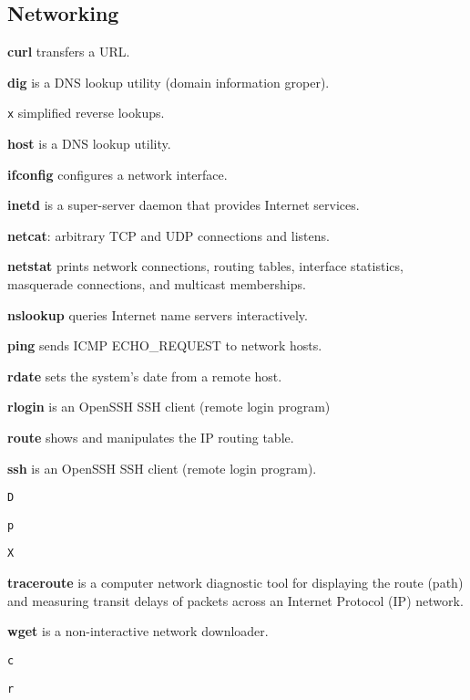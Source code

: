 \subsection{Networking}
\textbf{curl} transfers a URL.

\textbf{dig} is a DNS lookup utility (domain information groper).
\begin{enumx}
	\item [\texttt{x}] simplified reverse lookups.
\end{enumx}

\textbf{host} is a DNS lookup utility.

\textbf{ifconfig} configures a network interface.

\textbf{inetd} is a super-server daemon that provides Internet services.

\textbf{netcat}: arbitrary TCP and UDP connections and listens.

\textbf{netstat} prints network connections, routing tables, 
interface statistics, masquerade connections, and multicast memberships.

\textbf{nslookup} queries Internet name servers interactively.

\textbf{ping} sends ICMP ECHO\_REQUEST to network hosts.

\textbf{rdate} sets the system's date from a remote host.

\textbf{rlogin} is an OpenSSH SSH client (remote login program)

\textbf{route} shows and manipulates the IP routing table.

\textbf{ssh} is an OpenSSH SSH client (remote login program).
\begin{enumx}
	\item [\texttt{D}]
	\item [\texttt{p}]
	\item [\texttt{X}]
\end{enumx}

\textbf{traceroute} is a computer network diagnostic tool for 
displaying the route (path) and measuring transit delays of 
packets across an Internet Protocol (IP) network.

\textbf{wget} is a non-interactive network downloader.
\begin{enumx}
	\item [\texttt{c}]
	\item [\texttt{r}]
\end{enumx}